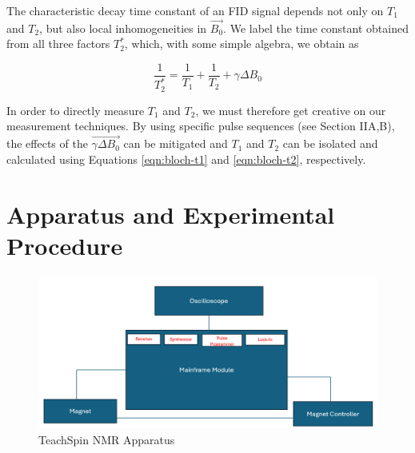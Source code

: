 \documentclass[
    floatfix,  %
    reprint,
    amsmath,
    amssymb,
    aps,
]{revtex4-2}
\begin{document}
The characteristic decay time constant of an FID signal depends not only on $T_1$ and $T_2$, but also local inhomogeneities in $\vec{B_0}$. We label the time constant obtained from all three factors $T_2^*$, which, with some simple algebra, we obtain as \cite{bloembergen1948}

\begin{equation}
    \frac{1}{T_2^*} = \frac{1}{T_1}+\frac{1}{T_2}+ \gamma \Delta B_0
\end{equation}

In order to directly measure $T_1$ and $T_2$, we must therefore get creative on our measurement techniques. By using specific pulse sequences (see Section IIA,B), the effects of the $\vec{\gamma \Delta B_0}$ can be mitigated and $T_1$ and $T_2$ can be isolated and calculated using Equations \ref{eqn:bloch-t1} and \ref{eqn:bloch-t2}, respectively.


















\section{Apparatus and Experimental Procedure}

\begin{figure}
    \centering
    \includegraphics[width=\linewidth]{figs/Screenshot 2025-05-05 201540.png}
    \caption{TeachSpin NMR Apparatus}
    \label{apparatus}
\end{figure}
\end{document}
